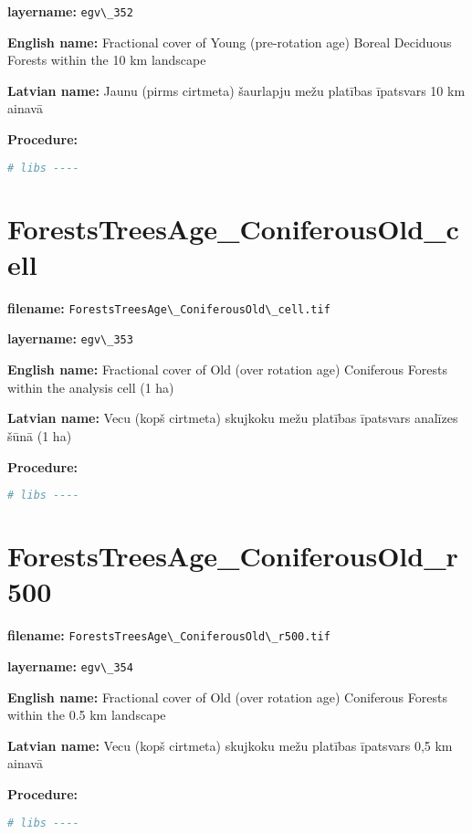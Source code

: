 \documentclass[
]{book}
\newcommand{\passthrough}[1]{#1}
\begin{document}
\textbf{layername:} \passthrough{\lstinline!egv\_352!}

\textbf{English name:} Fractional cover of Young (pre-rotation age) Boreal Deciduous Forests within the 10 km landscape

\textbf{Latvian name:} Jaunu (pirms cirtmeta) šaurlapju mežu platības īpatsvars 10 km ainavā

\textbf{Procedure:}

\begin{lstlisting}[language=R]
# libs ----
\end{lstlisting}

\section{ForestsTreesAge\_ConiferousOld\_cell}\label{ch06.353}

\textbf{filename:} \passthrough{\lstinline!ForestsTreesAge\_ConiferousOld\_cell.tif!}

\textbf{layername:} \passthrough{\lstinline!egv\_353!}

\textbf{English name:} Fractional cover of Old (over rotation age) Coniferous Forests within the analysis cell (1 ha)

\textbf{Latvian name:} Vecu (kopš cirtmeta) skujkoku mežu platības īpatsvars analīzes šūnā (1 ha)

\textbf{Procedure:}

\begin{lstlisting}[language=R]
# libs ----
\end{lstlisting}

\section{ForestsTreesAge\_ConiferousOld\_r500}\label{ch06.354}

\textbf{filename:} \passthrough{\lstinline!ForestsTreesAge\_ConiferousOld\_r500.tif!}

\textbf{layername:} \passthrough{\lstinline!egv\_354!}

\textbf{English name:} Fractional cover of Old (over rotation age) Coniferous Forests within the 0.5 km landscape

\textbf{Latvian name:} Vecu (kopš cirtmeta) skujkoku mežu platības īpatsvars 0,5 km ainavā

\textbf{Procedure:}

\begin{lstlisting}[language=R]
# libs ----
\end{lstlisting}
\end{document}
